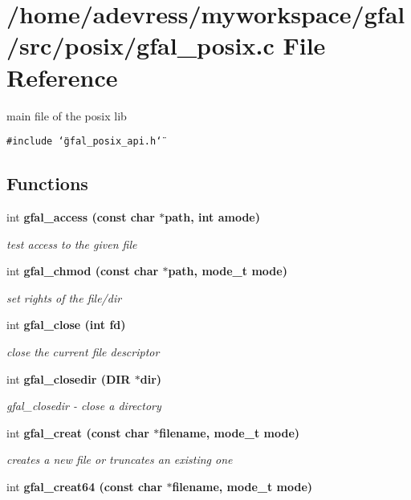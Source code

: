 \section{/home/adevress/myworkspace/gfal/src/posix/gfal\_\-posix.c File Reference}
\label{gfal__posix_8c}
main file of the posix lib 

{\tt \#include \char`\"{}gfal\_\-posix\_\-api.h\char`\"{}}\par
\subsection*{Functions}
\begin{CompactItemize}
\item 
int \bf{gfal\_\-access} (const char $\ast$path, int amode)
\begin{CompactList}\small\item\em test access to the given file \item\end{CompactList}\item 
int \bf{gfal\_\-chmod} (const char $\ast$path, mode\_\-t mode)
\begin{CompactList}\small\item\em set rights of the file/dir \item\end{CompactList}\item 
int \bf{gfal\_\-close} (int fd)
\begin{CompactList}\small\item\em close the current file descriptor \item\end{CompactList}\item 
int \bf{gfal\_\-closedir} (DIR $\ast$dir)
\begin{CompactList}\small\item\em gfal\_\-closedir - close a directory \item\end{CompactList}\item 
int \bf{gfal\_\-creat} (const char $\ast$filename, mode\_\-t mode)
\begin{CompactList}\small\item\em creates a new file or truncates an existing one \item\end{CompactList}\item 
int \bf{gfal\_\-creat64} (const char $\ast$filename, mode\_\-t mode)\label{group__posix__group_g48783e60cafa1a3bf9aa2170b99f9b08}


\end{CompactItemize}
